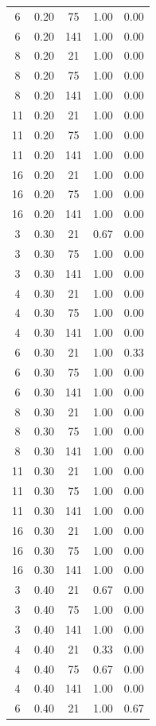 \documentclass[10pt,a4paper]{article}
\begin{document}
\begin{center}
\begin{longtable}{ccccc}
6  & 0.20 & 75  & 1.00 & 0.00 \\
6  & 0.20 & 141 & 1.00 & 0.00 \\
8  & 0.20 & 21  & 1.00 & 0.00 \\
8  & 0.20 & 75  & 1.00 & 0.00 \\
8  & 0.20 & 141 & 1.00 & 0.00 \\
11 & 0.20 & 21  & 1.00 & 0.00 \\
11 & 0.20 & 75  & 1.00 & 0.00 \\
11 & 0.20 & 141 & 1.00 & 0.00 \\
16 & 0.20 & 21  & 1.00 & 0.00 \\
16 & 0.20 & 75  & 1.00 & 0.00 \\
16 & 0.20 & 141 & 1.00 & 0.00 \\
3  & 0.30 & 21  & 0.67 & 0.00 \\
3  & 0.30 & 75  & 1.00 & 0.00 \\
3  & 0.30 & 141 & 1.00 & 0.00 \\
4  & 0.30 & 21  & 1.00 & 0.00 \\
4  & 0.30 & 75  & 1.00 & 0.00 \\
4  & 0.30 & 141 & 1.00 & 0.00 \\
6  & 0.30 & 21  & 1.00 & 0.33 \\
6  & 0.30 & 75  & 1.00 & 0.00 \\
6  & 0.30 & 141 & 1.00 & 0.00 \\
8  & 0.30 & 21  & 1.00 & 0.00 \\
8  & 0.30 & 75  & 1.00 & 0.00 \\
8  & 0.30 & 141 & 1.00 & 0.00 \\
11 & 0.30 & 21  & 1.00 & 0.00 \\
11 & 0.30 & 75  & 1.00 & 0.00 \\
11 & 0.30 & 141 & 1.00 & 0.00 \\
16 & 0.30 & 21  & 1.00 & 0.00 \\
16 & 0.30 & 75  & 1.00 & 0.00 \\
16 & 0.30 & 141 & 1.00 & 0.00 \\
3  & 0.40 & 21  & 0.67 & 0.00 \\
3  & 0.40 & 75  & 1.00 & 0.00 \\
3  & 0.40 & 141 & 1.00 & 0.00 \\
4  & 0.40 & 21  & 0.33 & 0.00 \\
4  & 0.40 & 75  & 0.67 & 0.00 \\
4  & 0.40 & 141 & 1.00 & 0.00 \\
6  & 0.40 & 21  & 1.00 & 0.67 \\

\end{longtable}
\end{center}
\end{document}
